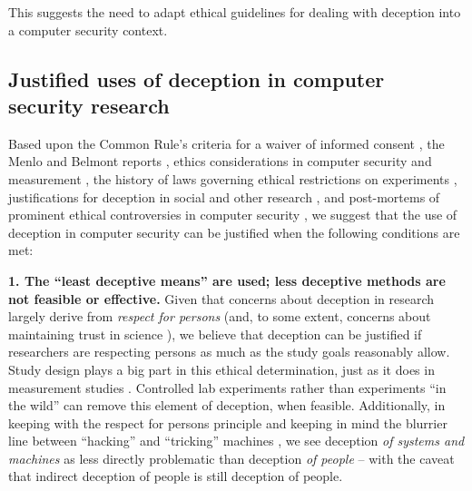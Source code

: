 This suggests the need to adapt ethical guidelines for dealing with deception into a computer security context.

\subsection{Justified uses of deception in computer security research}

Based upon 
the Common Rule's criteria for a waiver of informed consent \cite{InformedConsentFAQs},
the Menlo and Belmont reports \cite{menloReport,belmontReport},
ethics considerations in computer security and measurement \cite{FosteringResponsibleComputing,partridgeEthicalConsiderationsNetwork2016,kohnoEthicalFrameworksComputer,cranorConferenceSubmissionReview},
the history of laws governing ethical restrictions on experiments \cite{curranGovernmentalRegulationUse1969,finnEthicsGovernanceDevelopment2023},
justifications for deception in social and other research \cite{goodeEthicsDeceptionSocial1996,christensenDeceptionPsychologicalResearch1988,findleyObligatedDeceiveAliases2016},
and post-mortems of prominent ethical controversies in computer security \cite{narayananNoEncoreEncore2015,jakobssonWhyHowPerform2008},
we suggest that the use of deception in computer security can be justified when the following conditions are met:


\textbf{1. The ``least deceptive means'' are used; less deceptive methods are not feasible or effective.}
Given that concerns about deception in research largely derive from \emph{respect for persons} \cite{menloReport,belmontReport,FosteringResponsibleComputing} (and, to some extent, concerns about maintaining trust in science \cite{baumrindResearchUsingIntentional1985,meadResearchHumanBeings,robertt.bowerEthicsSocialResearch1978,curranGovernmentalRegulationUse1969}),
we believe that deception can be justified if researchers are respecting persons as much as the study goals reasonably allow.
Study design plays a big part in this ethical determination, just as it does in measurement studies \cite{partridgeEthicalConsiderationsNetwork2016}.
Controlled lab experiments rather than experiments ``in the wild'' can remove this element of deception, when feasible.
Additionally, in keeping with the respect for persons principle and keeping in mind the blurrier line between ``hacking'' and ``tricking'' machines \cite{calo2018}, we see deception \emph{of systems and machines} as less directly problematic than deception \emph{of people} -- with the caveat that indirect deception of people is still deception of people.

